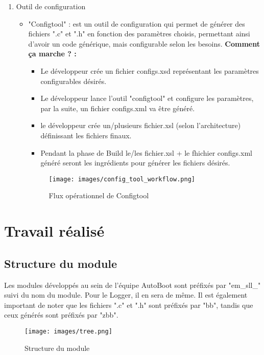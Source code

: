 \documentclass[a4paper, 12pt]{report}
\begin{document}
\begin{enumerate}
        \item Outil de configuration
        \begin{itemize}
            \item "Configtool" : est un outil de configuration qui permet de générer des fichiers  ".c" et ".h" en fonction des paramètres choisis, permettant ainsi d'avoir un code générique, mais configurable selon les besoins.
            \textbf{Comment ça marche ? :}
            \vspace{0.2cm}
            \begin{itemize}
                \item Le développeur crée un fichier configs.xsd représentant les paramètres configurables désirés.
                \item Le développeur lance l'outil "configtool" et configure les paramètres, par la suite, un fichier configs.xml va être généré.
                \item le développeur crée un/plusieurs fichier.xsl (selon l'architecture) définissant les fichiers finaux.
                \item Pendant la phase de Build le/les fichier.xsl + le fhichier configs.xml généré seront les ingrédients pour générer les fichiers désirés.
                \end{itemize}
                \begin{figure}[H]
                \centering
                \texttt{[image: images/config\_tool\_workflow.png]}
                \caption{Flux opérationnel de Configtool}
                \label{fig:cfg}
                \end{figure}
        \end{itemize}
            
\end{enumerate}



\chapter{\textbf{Travail réalisé}}

\section{Structure du module}
    Les modules développés au sein de l'équipe AutoBoot sont préfixés par "em\_sll\_" suivi du nom du module. Pour le Logger, il en sera de même. Il est également important de noter que les fichiers ".c" et ".h" sont préfixés par "bb", tandis que ceux générés sont préfixés par "zbb".
       \begin{figure}[H]
           \centering
           \texttt{[image: images/tree.png]}
           \caption{Structure du module }
           \label{fig:testL1}
       \end{figure}
\end{document}
